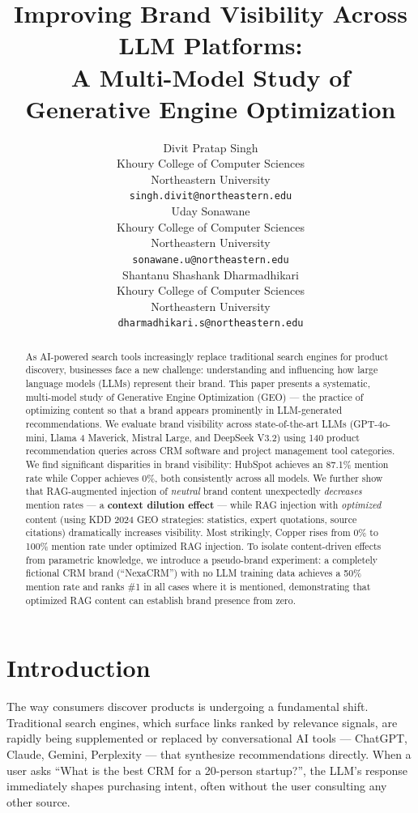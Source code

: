 \documentclass{article}
\title{Improving Brand Visibility Across LLM Platforms:\\
A Multi-Model Study of Generative Engine Optimization}
\author{%
  Divit Pratap Singh \\
  Khoury College of Computer Sciences \\
  Northeastern University \\
  \texttt{singh.divit@northeastern.edu} \\
  \And
  Uday Sonawane \\
  Khoury College of Computer Sciences \\
  Northeastern University \\
  \texttt{sonawane.u@northeastern.edu} \\
  \And
  Shantanu Shashank Dharmadhikari \\
  Khoury College of Computer Sciences \\
  Northeastern University \\
  \texttt{dharmadhikari.s@northeastern.edu} \\
}
\begin{document}
\maketitle

\begin{abstract}
As AI-powered search tools increasingly replace traditional search engines for product discovery, businesses face a new challenge: understanding and influencing how large language models (LLMs) represent their brand. This paper presents a systematic, multi-model study of Generative Engine Optimization (GEO) — the practice of optimizing content so that a brand appears prominently in LLM-generated recommendations. We evaluate brand visibility across state-of-the-art LLMs (GPT-4o-mini, Llama 4 Maverick, Mistral Large, and DeepSeek V3.2) using 140 product recommendation queries across CRM software and project management tool categories. We find significant disparities in brand visibility: HubSpot achieves an 87.1\% mention rate while Copper achieves 0\%, both consistently across all models. We further show that RAG-augmented injection of \emph{neutral} brand content unexpectedly \emph{decreases} mention rates — a \textbf{context dilution effect} — while RAG injection with \emph{optimized} content (using KDD 2024 GEO strategies: statistics, expert quotations, source citations) dramatically increases visibility. Most strikingly, Copper rises from 0\% to 100\% mention rate under optimized RAG injection. To isolate content-driven effects from parametric knowledge, we introduce a pseudo-brand experiment: a completely fictional CRM brand (``NexaCRM'') with no LLM training data achieves a 50\% mention rate and ranks \#1 in all cases where it is mentioned, demonstrating that optimized RAG content can establish brand presence from zero.
\end{abstract}

\section{Introduction}

The way consumers discover products is undergoing a fundamental shift. Traditional search engines, which surface links ranked by relevance signals, are rapidly being supplemented or replaced by conversational AI tools — ChatGPT, Claude, Gemini, Perplexity — that synthesize recommendations directly. When a user asks ``What is the best CRM for a 20-person startup?'', the LLM's response immediately shapes purchasing intent, often without the user consulting any other source.
\end{document}
